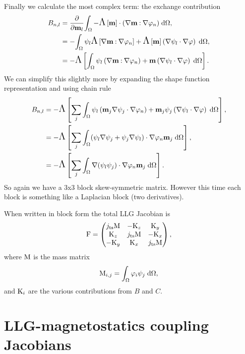 Finally we calculate the most complex term: the exchange contribution
\begin{equation}
  \begin{aligned}
    B_{n,l} &=  \frac{\partial }{\partial \mathbf{m}_l} {\int_{\Omega} - \text{\Large{$\Lambda$}}\left[ \mathbf{m} \right] \cdot (\nabla \mathbf{m} \mathbin{:} \nabla \varphi_n) {\; \text{d}} {\Omega}} ,\\
    &= - {\int_{\Omega}  \psi_l \text{\Large{$\Lambda$}}\left[ \nabla \mathbf{m} \mathbin{:} \nabla \varphi_n \right]
       + \text{\Large{$\Lambda$}}\left[ \mathbf{m} \right] \left( \nabla \psi_l \cdot \nabla \varphi \right) {\; \text{d}} {\Omega}}, \\
     &= - \text{\Large{$\Lambda$}}\left[  {\int_{\Omega}  \psi_l \left( \nabla \mathbf{m} \mathbin{:} \nabla \varphi_n \right)
         + \mathbf{m} \left( \nabla \psi_l \cdot \nabla \varphi \right) {\; \text{d}} {\Omega}} \right].
   \end{aligned}
 \end{equation}
We can simplify this slightly more by expanding the shape function representation and using chain rule
\begin{equation}
  \begin{aligned}
    B_{n,l} &= - \text{\Large{$\Lambda$}}\left[  \sum_j {\int_{\Omega}  \psi_l \left( \mathbf{m}_j \nabla \psi_j \cdot \nabla \varphi_n \right)
        + \mathbf{m}_j \psi_j \left( \nabla \psi_l \cdot \nabla \varphi \right) {\; \text{d}} {\Omega}} \right], \\
    &= - \text{\Large{$\Lambda$}}\left[  \sum_j {\int_{\Omega}  (\psi_l \nabla \psi_j + \psi_j \nabla \psi_l)
        \cdot \nabla \varphi_n  \mathbf{m}_j  {\; \text{d}} {\Omega}} \right], \\
    &= - \text{\Large{$\Lambda$}}\left[  \sum_j {\int_{\Omega}  \nabla(\psi_l \psi_j) \cdot \nabla \varphi_n  \mathbf{m}_j  {\; \text{d}} {\Omega}} \right].
  \end{aligned}
\end{equation} 
So again we have a 3x3 block skew-symmetric matrix.
However this time each block is something like a Laplacian block (two derivatives).


When written in block form the total LLG Jacobian is
\begin{equation}
  \mathrm{F} =
  \begin{pmatrix}
    j_\text{ts} \mathrm{M}    & -\mathrm{K}_z       & \mathrm{K}_y \\
    \mathrm{K}_z         & j_\text{ts}\mathrm{M}    & -\mathrm{K}_x \\
    -\mathrm{K}_y        & \mathrm{K}_x        & j_\text{ts} \mathrm{M}
  \end{pmatrix}, 
\end{equation}
where $\mathrm{M}$ is the mass matrix
\begin{equation}
  \label{eq:mass-matrix}
  \mathrm{M}_{i,j} = {\int_{\Omega} \varphi_i \psi_j {\; \text{d}} {\Omega}},
\end{equation}
and $\mathrm{K}_i$ are the various contributions from $B$ and $C$.

\section{LLG-magnetostatics coupling Jacobians}
\label{sec:llg-magn-coupl}

